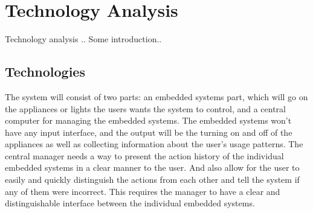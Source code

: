 \section{Technology Analysis} 
\label{chap:Technology Analysis}
Technology analysis    .. Some introduction..
\subsection{Technologies}
\label{sub:Technologies}
The system will consist of two parts: an embedded systems part, which will go on
the appliances or lights the users wants the system to control, and a central
computer for managing the embedded systems. The embedded systems won't have any
input interface, and the output will be the turning on and off of the appliances
as well as collecting information about the user's usage patterns.
The central manager needs a way to present the action history of the individual embedded systems in a clear manner to the user.
And also allow for the user to easily and quickly distinguish the actions from each other and tell the system if any of them were incorrect.
This requires the manager to have a clear and distinguishable interface between the individual embedded systems.
